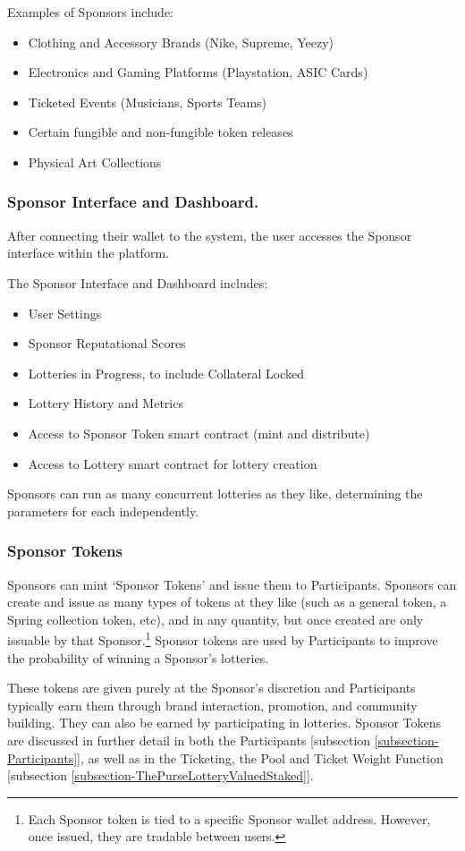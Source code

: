 \documentclass[runningheads]{llncs}
\begin{document}
Examples of Sponsors include:
\begin{itemize}
\item Clothing and Accessory Brands (Nike, Supreme, Yeezy)
\item Electronics and Gaming Platforms (Playstation, ASIC Cards)
\item Ticketed Events (Musicians, Sports Teams)
\item Certain fungible and non-fungible token releases
\item Physical Art Collections
\end{itemize}

\subsubsection{Sponsor Interface and Dashboard.}  After connecting their wallet to the system, the user accesses the Sponsor interface within the platform.  

The Sponsor Interface and Dashboard includes:
\begin{itemize}
\item User Settings 
\item Sponsor Reputational Scores
\item Lotteries in Progress, to include Collateral Locked
\item Lottery History and Metrics
\item Access to Sponsor Token smart contract (mint and distribute)
\item Access to Lottery smart contract for lottery creation
\end{itemize}

Sponsors can run as many concurrent lotteries as they like, determining the parameters for each independently.

\subsubsection{Sponsor Tokens}  Sponsors can mint ‘Sponsor Tokens’ and issue them to Participants.  Sponsors can create and issue as many types of tokens at they like (such as a general token, a Spring collection token, etc), and in any quantity, but once created are only issuable by that Sponsor.\footnote{Each Sponsor token is tied to a specific Sponsor wallet address.  However, once issued, they are tradable between users.}   Sponsor tokens are used by Participants to improve the probability of winning a Sponsor’s lotteries.  

These tokens are given purely at the Sponsor’s discretion and Participants typically earn them through brand interaction, promotion, and community building.  They can also be earned by participating in lotteries.  Sponsor Tokens are discussed in further detail in both the Participants [subsection \ref{subsection-Participants}], as well as in the Ticketing, the Pool and Ticket Weight Function [subsection \ref{subsection-ThePurseLotteryValuedStaked}].
\end{document}
